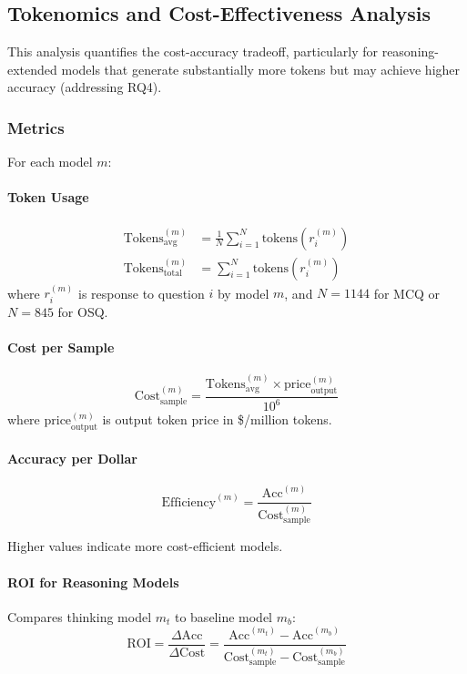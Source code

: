 \subsection{Tokenomics and Cost-Effectiveness Analysis}\label{sec:tokenomics}

This analysis quantifies the cost-accuracy tradeoff, particularly for reasoning-extended models that generate substantially more tokens but may achieve higher accuracy (addressing RQ4).

\subsubsection{Metrics}

For each model $m$:

\paragraph{Token Usage}
\begin{align}
\text{Tokens}_{\text{avg}}^{(m)} &= \frac{1}{N} \sum_{i=1}^{N} \text{tokens}(r_i^{(m)}) \\
\text{Tokens}_{\text{total}}^{(m)} &= \sum_{i=1}^{N} \text{tokens}(r_i^{(m)})
\end{align}
where $r_i^{(m)}$ is response to question $i$ by model $m$, and $N = 1144$ for MCQ or $N = 845$ for OSQ.

\paragraph{Cost per Sample}
\begin{equation}
\text{Cost}_{\text{sample}}^{(m)} = \frac{\text{Tokens}_{\text{avg}}^{(m)} \times \text{price}_{\text{output}}^{(m)}}{10^6}
\end{equation}
where $\text{price}_{\text{output}}^{(m)}$ is output token price in \$/million tokens.

\paragraph{Accuracy per Dollar}
\begin{equation}
\text{Efficiency}^{(m)} = \frac{\text{Acc}^{(m)}}{\text{Cost}_{\text{sample}}^{(m)}}
\end{equation}

Higher values indicate more cost-efficient models.

\paragraph{ROI for Reasoning Models}
Compares thinking model $m_t$ to baseline model $m_b$:
\begin{equation}
\text{ROI} = \frac{\Delta \text{Acc}}{\Delta \text{Cost}} = \frac{\text{Acc}^{(m_t)} - \text{Acc}^{(m_b)}}{\text{Cost}_{\text{sample}}^{(m_t)} - \text{Cost}_{\text{sample}}^{(m_b)}}
\end{equation}

